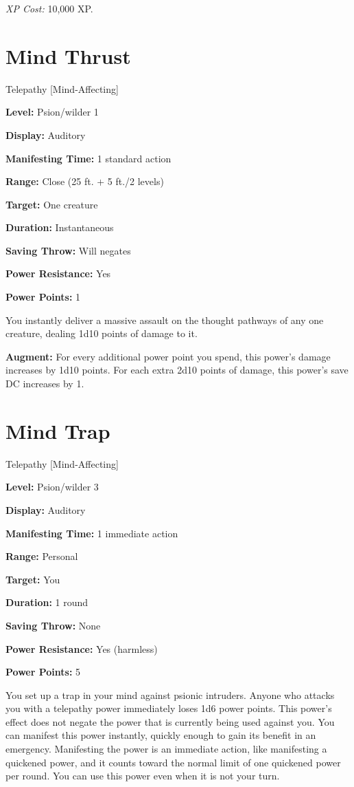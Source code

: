 \documentclass{article}
\begin{document}
\textit{XP Cost: }10,000 XP.

\vspace{12pt}
\section*{Mind Thrust}

Telepathy [Mind-Affecting]

\textbf{Level:} Psion/wilder 1

\textbf{Display:} Auditory

\textbf{Manifesting Time:} 1 standard action

\textbf{Range:} Close (25 ft. + 5 ft./2 levels)

\textbf{Target:} One creature

\textbf{Duration:} Instantaneous

\textbf{Saving Throw:} Will negates

\textbf{Power Resistance:} Yes

\textbf{Power Points:} 1

You instantly deliver a massive assault on the thought pathways of any one creature, 
dealing 1d10 points of damage to it.

\textbf{Augment:} For every additional power point you spend, this power's damage 
increases by 1d10 points. For each extra 2d10 points of damage, this power's save 
DC increases by 1.

\vspace{12pt}
\section*{Mind Trap}

Telepathy [Mind-Affecting]

\textbf{Level:} Psion/wilder 3

\textbf{Display:} Auditory

\textbf{Manifesting Time:} 1 immediate action

\textbf{Range:} Personal

\textbf{Target:} You

\textbf{Duration:} 1 round

\textbf{Saving Throw:} None

\textbf{Power Resistance:} Yes (harmless)

\textbf{Power Points:} 5

You set up a trap in your mind against psionic intruders. Anyone who attacks you 
with a telepathy power immediately loses 1d6 power points. This power's effect 
does not negate the power that is currently being used against you. You can manifest 
this power instantly, quickly enough to gain its benefit in an emergency. Manifesting 
the power is an immediate action, like manifesting a quickened power, and it counts 
toward the normal limit of one quickened power per round. You can use this power 
even when it is not your turn.
\end{document}
